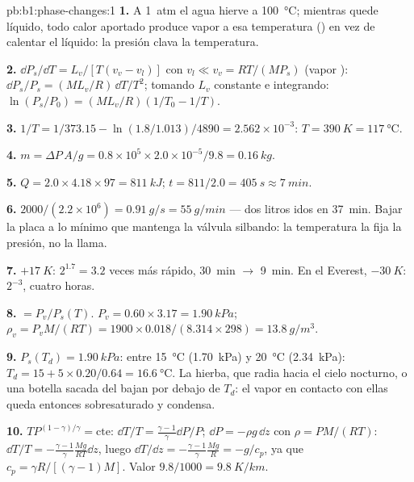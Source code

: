 \begin{solution}{pb:b1:phase-changes:1}
\textbf{1.} A \qty{1}{atm} el agua hierve a \qty{100}{\degreeCelsius};
mientras quede líquido, todo calor aportado produce vapor a esa
temperatura () en vez de calentar el líquido: la presión
clava la temperatura.

\textbf{2.} $\dd P_s/\dd T = L_v/[T(v_v - v_l)]$ con $v_l \ll v_v = RT/(MP_s)$
(vapor ): $\dd P_s/P_s = (ML_v/R)\,\dd T/T^2$; tomando $L_v$
constante e integrando: $\ln(P_s/P_0) = (ML_v/R)(1/T_0 - 1/T)$.

\textbf{3.} $1/T = 1/373.15 - \ln(1.8/1.013)/4890 = 2.562 \times 10^{-3}$: $T =
\qty{390}{K} = \qty{117}{\degreeCelsius}$.

\textbf{4.} $m = \Delta P\,A/g = 0.8 \times 10^5 \times 2.0 \times 10^{-5}/9.8 =
\qty{0.16}{kg}$.

\textbf{5.} $Q = 2.0 \times 4.18 \times 97 = \qty{811}{kJ}$; $t = 811/2.0 =
\qty{405}{s} \approx \qty{7}{min}$.

\textbf{6.} $2000/(2.2 \times 10^6) = \qty{0.91}{g/s} = \qty{55}{g/min}$ --- dos
litros idos en \qty{37}{min}. Bajar la placa a lo mínimo que mantenga la
válvula silbando: la temperatura la fija la presión, no la llama.

\textbf{7.} $+\qty{17}{K}$: $2^{1.7} = 3.2$ veces más rápido, \qty{30}{min}
$\to$ \qty{9}{min}. En el Everest, $-\qty{30}{K}$: $2^{-3}$, cuatro horas.

\textbf{8.}  $= P_v/P_s(T)$. $P_v = 0.60 \times 3.17 =
\qty{1.90}{kPa}$; $\rho_v = P_vM/(RT) = 1900 \times 0.018/(8.314 \times 298) =
\qty{13.8}{g/m^3}$.

\textbf{9.} $P_s(T_d) = \qty{1.90}{kPa}$: entre \qty{15}{\degreeCelsius}
(\qty{1.70}{kPa}) y \qty{20}{\degreeCelsius} (\qty{2.34}{kPa}): $T_d = 15 + 5 \times 0.20/0.64
= \qty{16.6}{\degreeCelsius}$. La hierba, que radia hacia el cielo
nocturno, o una botella sacada del  bajan por debajo de $T_d$:
el vapor en contacto con ellas queda entonces sobresaturado y condensa.

\textbf{10.} $TP^{(1-\gamma)/\gamma} = \text{cte}$: $\dd T/T = \frac{\gamma - 1}{\gamma}
\dd P/P$; $\dd P = -\rho g\,\dd z$ con $\rho = PM/(RT)$: $\dd T/T = -\frac{\gamma -
1}{\gamma}\frac{Mg}{RT}\dd z$, luego $\dd T/\dd z = -\frac{\gamma - 1}{\gamma}\frac{Mg}{R} =
-g/c_p$, ya que $c_p = \gamma R/[(\gamma - 1)M]$. Valor $9.8/1000 = \qty{9.8}{K/km}$.


\end{solution}
